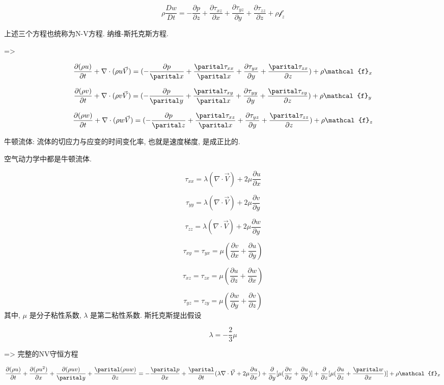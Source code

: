 \documentclass[UTF8]{ctexart}
\begin{document}
$$
	\rho \frac{Dw}{Dt} = -\frac{\partial p}{\partial z} + \frac{\partial \tau_{xz}}{\partial x} + \frac{\partial \tau_{yz}}{\partial y} + \frac{\partial \tau_{zz}}{\partial  z} + \rho \mathcal{f}_z
$$

上述三个方程也统称为N-V方程. 纳维-斯托克斯方程.

=>

$$
	\frac{\partial (\rho u)}{\partial t} + \nabla \cdot (\rho u \vec{V}) = (-\frac{\partial p}{\parital x} + \frac{\parital \tau_{xx}}{\parital x} + \frac{\partial \tau_{yx}}{\partial y} +
	\frac{\parital \tau_{zx}}{\partial z}) + \rho \mathcal{f}_x
$$

$$
	\frac{\partial (\rho v)}{\partial t} + \nabla \cdot (\rho v \vec{V}) = (-\frac{\partial p}{\parital y} + \frac{\parital \tau_{xy}}{\parital x} + \frac{\partial \tau_{yy}}{\partial y} +
	\frac{\parital \tau_{zy}}{\partial z}) + \rho \mathcal{f}_y
$$

$$
	\frac{\partial (\rho w)}{\partial t} + \nabla \cdot (\rho w \vec{V}) = (-\frac{\partial p}{\parital z} + \frac{\parital \tau_{xz}}{\parital x} + \frac{\partial \tau_{yz}}{\partial y} +
	\frac{\parital \tau_{zz}}{\partial z}) + \rho \mathcal{f}_z
$$

牛顿流体: 流体的切应力与应变的时间变化率, 也就是速度梯度, 是成正比的.

空气动力学中都是牛顿流体.

$$
	\tau_{xx} = \lambda (\nabla \cdot \vec{V}) + 2\mu \frac{\partial u}{\partial x}
$$

$$
	\tau_{yy} = \lambda(\nabla \cdot \vec{V}) + 2 \mu \frac{\partial v}{\partial y}
$$

$$
	\tau_{zz} = \lambda(\nabla \cdot \vec{V}) + 2 \mu \frac{\partial w}{\partial y}
$$

$$
	\tau_{xy} = \tau_{yx} =   \mu (\frac{\partial v}{\partial x} + \frac{\partial u}{ \partial y})
$$

$$
	\tau_{xz} = \tau_{zx} =   \mu (\frac{\partial u}{\partial z} + \frac{\partial w}{ \partial x})
$$

$$
	\tau_{yz} = \tau_{zy} =   \mu (\frac{\partial w}{\partial y} + \frac{\partial v}{ \partial z})
$$
其中, $\mu$ 是分子粘性系数, $\lambda$ 是第二粘性系数. 斯托克斯提出假设

$$
	\lambda = -\frac{2}{3} \mu
$$

=> 完整的NV守恒方程

$$
	\frac{\partial (\rho u)}{\partial t} + \frac{\partial (\rho u^2)}{\partial x} + \frac{\partial(\rho uv)}{ \parital y} + \frac{\parital (\rho u w)}{\partial z} =
	-\frac{\parital p}{\partial x} + \frac{\parital}{\partial t}(\lambda \nabla \cdot \vec{V} + 2\mu \frac{\partial u}{\partial x}) +
	\frac{\partial }{\partial y}[\mu(\frac{\partial v}{\partial x} + \frac{\partial u}{\partial y})] +
	\frac{\partial}{\partial z}[\mu(\frac{\partial u}{\partial z} + \frac{\parital w}{\partial x})] + \rho \mathcal{f}_x
$$
\end{document}
